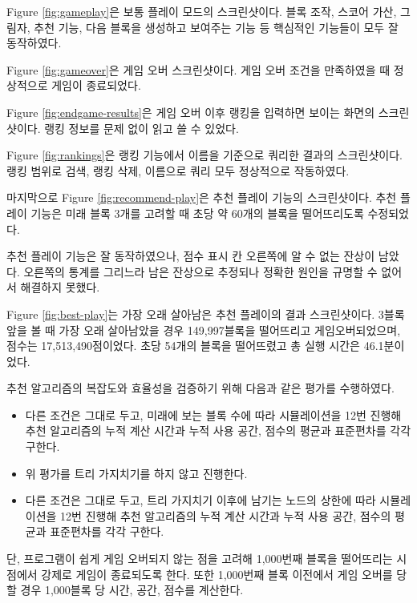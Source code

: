 Figure \ref{fig:gameplay}은 보통 플레이 모드의 스크린샷이다. 블록 조작, 스코어 가산,
그림자, 추천 기능, 다음 블록을 생성하고 보여주는 기능 등 핵심적인 기능들이 모두 잘 동작하였다.

Figure \ref{fig:gameover}은 게임 오버 스크린샷이다. 게임 오버 조건을 만족하였을 때
정상적으로 게임이 종료되었다.

Figure \ref{fig:endgame-results}은 게임 오버 이후 랭킹을 입력하면 보이는 화면의
스크린샷이다. 랭킹 정보를 문제 없이 읽고 쓸 수 있었다.

Figure \ref{fig:rankings}은 랭킹 기능에서 이름을 기준으로 쿼리한 결과의 스크린샷이다.
랭킹 범위로 검색, 랭킹 삭제, 이름으로 쿼리 모두 정상적으로 작동하였다.

마지막으로 Figure \ref{fig:recommend-play}은 추천 플레이 기능의 스크린샷이다.
추천 플레이 기능은 미래 블록 3개를 고려할 때 초당 약 60개의 블록을 떨어뜨리도록
수정되었다.

추천 플레이 기능은 잘 동작하였으나, 점수 표시 칸 오른쪽에 알 수 없는 잔상이 남았다.
오른쪽의 통계를 그리느라 남은 잔상으로 추정되나 정확한 원인을 규명할 수 없어서 해결하지 못했다.

Figure \ref{fig:best-play}는 가장 오래 살아남은 추천 플레이의 결과 스크린샷이다.
3블록 앞을 볼 때 가장 오래 살아남았을 경우 149,997블록을 떨어뜨리고 게임오버되었으며,
점수는 17,513,490점이었다. 초당 54개의 블록을 떨어뜨렸고 총 실행 시간은 46.1분이었다.

추천 알고리즘의 복잡도와 효율성을 검증하기 위해 다음과 같은 평가를 수행하였다.
\begin{itemize}
    \item 다른 조건은 그대로 두고, 미래에 보는 블록 수에 따라 시뮬레이션을 12번 진행해
    추천 알고리즘의 누적 계산 시간과 누적 사용 공간, 점수의
    평균과 표준편차를 각각 구한다.
    \item 위 평가를 트리 가지치기를 하지 않고 진행한다.
    \item 다른 조건은 그대로 두고, 트리 가지치기 이후에 남기는 노드의 상한에 따라
    시뮬레이션을 12번 진행해 추천 알고리즘의 누적 계산 시간과 누적 사용 공간, 점수의
    평균과 표준편차를 각각 구한다.
\end{itemize}
단, 프로그램이 쉽게 게임 오버되지 않는 점을 고려해 1,000번째 블록을 떨어뜨리는 시점에서
강제로 게임이 종료되도록 한다. 또한 1,000번째 블록 이전에서 게임 오버를 당할 경우
1,000블록 당 시간, 공간, 점수를 계산한다.

